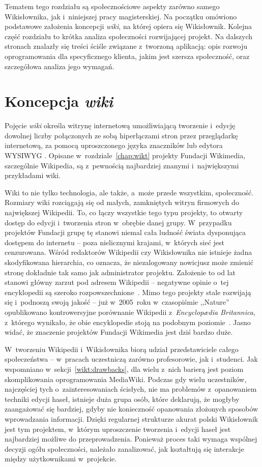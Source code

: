 Tematem tego rozdziału są społecznościowe aspekty zarówno samego Wikisłownika, jak i~niniejszej pracy magisterskiej. Na początku omówiono podstawowe założenia koncepcji \emph{wiki}, na której opiera się Wikisłownik. Kolejna część rozdziału to krótka analiza społeczności rozwijającej projekt. Na dalszych stronach znalazły się treści ściśle związane z~tworzoną aplikacją: opis rozwoju oprogramowania dla specyficznego klienta, jakim jest szersza społeczność, oraz szczegółowa analiza jego wymagań.

\section{Koncepcja \emph{wiki}}
Pojęcie \emph{wiki} określa witrynę internetową umożliwiającą tworzenie i~edycję dowolnej liczby połączonych ze sobą hiperłączami stron przez przeglądarkę internetową, za pomocą uproszczonego języka znaczników lub edytora WYSIWYG \cite{britannica}. Opisane w~rozdziale~\ref{chap:wikt} projekty Fundacji Wikimedia, szczególnie Wikipedia, są z~pewnością najbardziej znanymi i~największymi przykładami wiki.

Wiki to nie tylko technologia, ale także, a~może przede wszystkim, społeczność. Rozmiary wiki rozciągają się od małych, zamkniętych witryn firmowych do największej Wikipedii. To, co łączy wszystkie tego typu projekty, to otwarty dostęp do edycji i~tworzenia stron w~obrębie danej grupy. W~przypadku projektów Fundacji grupę tę stanowi niemal cała ludność świata dysponująca dostępem do internetu -- poza nielicznymi krajami, w~których sieć jest cenzurowana. Wśród redaktorów Wikipedii czy Wikisłownika nie istnieje żadna skodyfikowana hierarchia, co oznacza, że niezalogowany nowicjusz może zmienić stronę dokładnie tak samo jak administrator projektu. Założenie to od lat stanowi główny zarzut pod adresem Wikipedii -- negatywne opinie o~tej encyklopedii są szeroko rozpowszechnione~\cite{knol}. Mimo tego projekty stale rozwijają się i~podnoszą swoją jakość -- już w~2005~roku w~czasopiśmie ,,Nature'' opublikowano kontrowersyjne porównanie Wikipedii z~\emph{Encyclopædia Britannica}, z~którego wynikało, że obie encyklopedie stoją na podobnym poziomie~\cite{nature:britannica}. Jasno widać, że znaczenie projektów Fundacji Wikimedia jest dziś bardzo duże.

W~tworzeniu Wikipedii i~Wikisłownika biorą udział przedstawiciele całego społeczeństwa -- w~pracach uczestniczą zarówno profesorowie, jak i~studenci. Jak wspomniano w~sekcji~\ref{wikt:drawbacks}, dla wielu z~nich barierą jest poziom skomplikowania oprogramowania MediaWiki. Podczas gdy wielu uczestników, najczęściej tych o~zainteresowaniach ścisłych, nie ma problemów z~opanowaniem techniki edycji haseł, istnieje duża grupa osób, które deklarują, że mogłyby zaangażować się bardziej, gdyby nie konieczność opanowania złożonych sposobów wprowadzania informacji. Dzięki regularnej strukturze akurat polski Wikisłownik jest tym projektem, w~którym uproszczenie tworzenia i~edycji haseł jest najbardziej możliwe do przeprowadzenia. Ponieważ proces taki wymaga wspólnej decyzji ogółu społeczności, należało zanalizować, jak kształtują się interakcje między użytkownikami w~projekcie.

